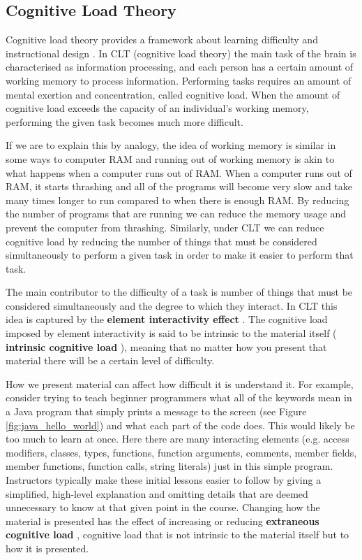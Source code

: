 \documentclass[12pt]{article}
\newcommand{\keyword}[1]{%
    \textbf{#1}%
}
\begin{document}
\subsection{Cognitive Load Theory}
Cognitive load theory provides a framework about learning difficulty and instructional design \citep{sweller1994cognitive}. In CLT (cognitive load theory) the main task of the brain is characterised as information processing, and each person has a certain amount of working memory to process information. Performing tasks requires an amount of mental exertion and concentration, called cognitive load. When the amount of cognitive load exceeds the capacity of an individual's working memory, performing the given task becomes much more difficult. 

If we are to explain this by analogy, the idea of working memory is similar in some ways to computer RAM and running out of working memory is akin to what happens when a computer runs out of RAM. When a computer runs out of RAM, it starts thrashing and all of the programs will become very slow and take many times longer to run compared to when there is enough RAM. By reducing the number of programs that are running we can reduce the memory usage and prevent the computer from thrashing. Similarly, under CLT we can reduce cognitive load by reducing the number of things that must be considered simultaneously to perform a given task in order to make it easier to perform that task. 

The main contributor to the difficulty of a task is number of things that must be considered simultaneously and the degree to which they interact. In CLT this idea is captured by the \keyword{element interactivity effect} \citep{sweller2011element}. The cognitive load imposed by element interactivity is said to be intrinsic to the material itself (\keyword{intrinsic cognitive load}), meaning that no matter how you present that material there will be a certain level of difficulty.

How we present material can affect how difficult it is understand it. For example, consider trying to teach beginner programmers what all of the keywords mean in a Java program that simply prints a message to the screen (see Figure \ref{fig:java_hello_world}) and what each part of the code does. This would likely be too much to learn at once. Here there are many interacting elements (e.g. access modifiers, classes, types, functions, function arguments, comments, member fields, member functions, function calls, string literals) just in this simple program. Instructors typically make these initial lessons easier to follow by giving a simplified, high-level explanation and omitting details that are deemed unnecessary to know at that given point in the course. Changing how the material is presented has the effect of increasing or reducing \keyword{extraneous cognitive load}, cognitive load that is not intrinsic to the material itself but to how it is presented. 
\end{document}
